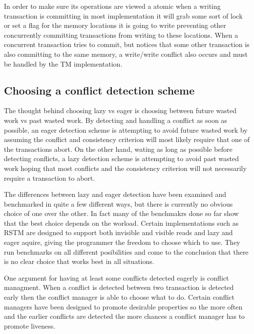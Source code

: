 In order to make sure its operations are viewed a atomic when a writing transaction is committing in most implementation it will grab some sort of lock or set a flag for the memory locations it is going to write preventing other concurrently committing transactions from writing to these locations.
When a concurrent transaction tries to commit, but notices that some other transaction is also committing to the same memory, a write/write conflict also occurs and must be handled by the TM implementation.

\subsection{Choosing a conflict detection scheme}

The thought behind choosing lazy vs eager is choosing between future wasted work vs past wasted work.
By detecting and handling a conflict as soon as possible, an eager detection scheme is attempting to avoid future wasted work by assuming the conflict and consistency criterion will most likely require that one of the transactions abort.
On the other hand, wating as long as possible before detecting conflicts, a lazy detection scheme is attempting to avoid past wasted work hoping that most conflicts and the consistency criterion will not necessarily require a transaction to abort.

The differences between lazy and eager detection have been examined and benchmarked in quite a few different ways, but there is currently no obvious choice of one over the other.
In fact many of the benchmakrs done so far show that the best choice depends on the worload.
Certain implementations such as RSTM \cite{Marathe06loweringthe} are designed to support both invisible and visible reads and lazy and eager aquire, giving the programmer the freedom to choose which to use.
They \cite{Marathe06loweringthe} run benchmarks on all different posibilities and come to the conclusion that there is no clear choice that works best in all situations.

One argument for having at least some conflicts detected eagerly is conflict managment.
When a conflict is detected between two transaction is detected early then the conflict manager is able to choose what to do.
Certain conflict managers have been designed to promote desirable properties so the more often and the earlier conflicts are detected the more chances a conflict manager has to promote liveness.

